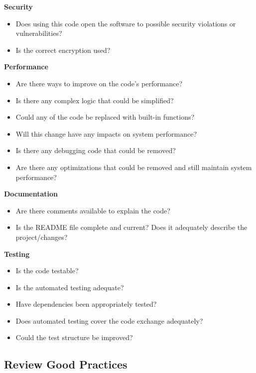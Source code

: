 \documentclass[
]{book}
\providecommand{\tightlist}{%
  \setlength{\itemsep}{0pt}\setlength{\parskip}{0pt}}
\begin{document}
\textbf{Security}

\begin{itemize}
\tightlist
\item
  Does using this code open the software to possible security violations or vulnerabilities?
\item
  Is the correct encryption used?
\end{itemize}

\textbf{Performance}

\begin{itemize}
\tightlist
\item
  Are there ways to improve on the code's performance?
\item
  Is there any complex logic that could be simplified?
\item
  Could any of the code be replaced with built-in functions?
\item
  Will this change have any impacts on system performance?
\item
  Is there any debugging code that could be removed?
\item
  Are there any optimizations that could be removed and still maintain system performance?
\end{itemize}

\textbf{Documentation}

\begin{itemize}
\tightlist
\item
  Are there comments available to explain the code?
\item
  Is the README file complete and current? Does it adequately describe the project/changes?
\end{itemize}

\textbf{Testing}

\begin{itemize}
\tightlist
\item
  Is the code testable?
\item
  Is the automated testing adequate?
\item
  Have dependencies been appropriately tested?
\item
  Does automated testing cover the code exchange adequately?
\item
  Could the test structure be improved?
\end{itemize}

\hypertarget{review-good-practices}{%
\subsection{Review Good Practices}\label{review-good-practices}}
\end{document}
